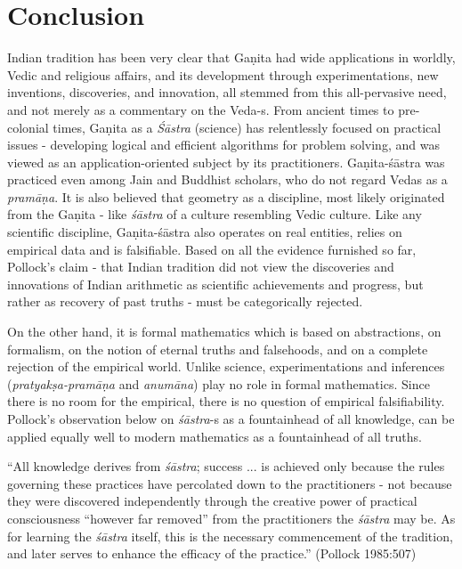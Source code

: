 \medskip

\section*{Conclusion}

Indian tradition has been very clear that Gaṇita had wide applications in worldly, Vedic and religious affairs, and its development through experimentations, new inventions, discoveries, and innovation, all stemmed from this all-pervasive need, and not merely as a commentary on the Veda-s. From ancient times to pre-colonial times, Gaṇita as a {\sl Śāstra} (science) has relentlessly focused on practical issues - developing logical and efficient algorithms for problem solving, and was viewed as an application-oriented subject by its practitioners. Gaṇita-śāstra was practiced even among Jain and Buddhist scholars, who do not regard Vedas as a {\sl pramāṇa}. It is also believed that geometry as a discipline, most likely originated from the Gaṇita - like {\sl śāstra} of a culture resembling Vedic culture. Like any scientific discipline, Gaṇita-śāstra also operates on real entities, relies on empirical data and is falsifiable. Based on all the evidence furnished so far, Pollock’s claim - that Indian tradition did not view the discoveries and innovations of Indian arithmetic as scientific achievements and progress, but rather as recovery of past truths - must be categorically rejected.

On the other hand, it is formal mathematics which is based on abstractions, on formalism, on the notion of eternal truths and falsehoods, and on a complete rejection of the empirical world. Unlike science, experimentations and inferences ({\sl pratyakṣa-pramāṇa} and {\sl anumāna}) play no role in formal mathematics. Since there is no room for the empirical, there is no question of empirical falsifiability. Pollock’s observation below on {\sl śāstra}-s as a fountainhead of all knowledge, can be applied equally well to modern mathematics as a fountainhead of all truths.
\begin{myquote}
``All knowledge derives from {\sl śāstra}; success ... is achieved only because the rules governing these practices have percolated down to the practitioners - not because they were discovered independently through the creative power of practical consciousness ``however far removed'' from the practitioners the {\sl śāstra} may be. As for learning the {\sl śāstra} itself, this is the necessary commencement of the tradition, and later serves to enhance the efficacy of the practice.'' (Pollock 1985:507)
\end{myquote}

